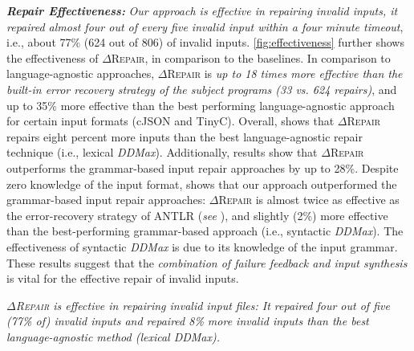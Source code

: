 \documentclass[acmsmall,screen,review,anonymous]{acmart}
\newenvironment{result}{\begin{framed}\centering\it}{\end{framed}}
\newcounter{todocounter}
\newcommand{\done}[1]{\marginpar{$*$}\textcolor{green}{\stepcounter{todocounter}\footnote[\thetodocounter]{\textcolor{black}{\textbf{DONE }}\textit{#1}}}}
\renewcommand{\done}[1]{} %
\renewcommand{\done}[1]{}
\newcommand{\approach}{\textsc{$\Delta$Repair}\xspace}
\newcommand{\ddmax}{\textit{DDMax}\xspace}
\begin{document}
\vspace{\baselineskip}
\noindent 
\textbf{\textit{Repair Effectiveness:}} %
\textit{Our approach %
is %
effective in repairing invalid inputs, it repaired almost four out of every five invalid input within a four minute timeout}, i.e., %
about 77\% (624 out of 806) of invalid inputs. 
\autoref{fig:effectiveness} further shows the effectiveness of \approach, in comparison to the baselines.  
In comparison to language-agnostic approaches, %
\approach is \textit{up to 18 times more effective than the built-in error recovery strategy of the subject programs (33 vs. 624 repairs)}, and %
up to 35\% more effective than the best performing language-agnostic approach for certain input formats (cJSON and TinyC). Overall, 
 shows that \approach repairs eight percent more inputs than the best language-agnostic repair technique (i.e., lexical \ddmax). 
Additionally, results show that %
\approach outperforms the %
grammar-based input repair approaches by up to 28\%. 
Despite zero knowledge of the input format, 
shows that %
our approach outperformed the grammar-based input repair approaches: \approach is almost twice as effective as the error-recovery strategy of ANTLR (\textit{see} ), and 
slightly (2\%) more effective than the best-performing grammar-based approach (i.e., syntactic \ddmax). %
The effectiveness of syntactic \ddmax is due to its knowledge of the input grammar. 
These results suggest that %
the \textit{combination of failure feedback and input synthesis} is vital for the effective repair of invalid inputs. 

\begin{result}
\approach is 
effective in repairing invalid input files: %
It repaired four out of five (77\% of) invalid inputs and repaired 8\% more invalid inputs than the best language-agnostic method (lexical \ddmax). %
\end{result}
\done{8\% is not much, and only on average, too. This may not be the best opener, although the later results (specifically data loss) are impressive. -- AZ}
\end{document}
